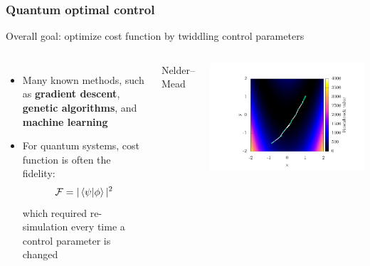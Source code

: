 \documentclass{beamer}
\begin{document}
\begin{frame}
\frametitle{Quantum optimal control}
Overall goal: optimize cost function by twiddling control parameters
\begin{columns}
\begin{itemize}
\pause
\item Many known methods, such as \textbf{gradient descent}, \textbf{genetic algorithms}, and \textbf{machine learning}
\pause
\item For quantum systems, cost function is often the fidelity:
$$
\mathcal{F}= |\braket{\psi|\phi}|^2
$$
which required re-simulation every time a control parameter is changed
\end{itemize}
\pause
{}
\begin{center}
Nelder--Mead
\end{center}
\includegraphics[width=\textwidth]{../data/1d/NM/NM.pdf}

\end{columns}
\end{frame}
\end{document}
